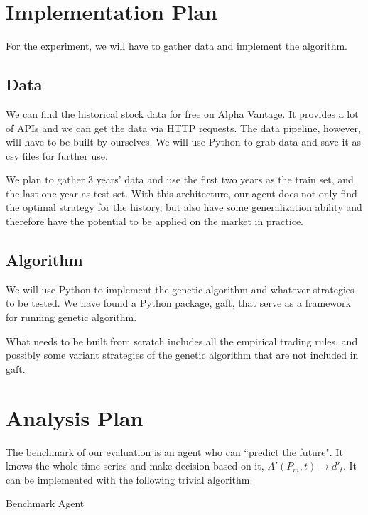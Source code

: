 \documentclass{article}
\begin{document}
\section{Implementation Plan}

For the experiment, we will have to gather data and implement the algorithm.

\subsection{Data}

We can find the historical stock data for free on \href{https://www.alphavantage.co/}{Alpha Vantage}.
It provides a lot of APIs and we can get the data via HTTP requests.
The data pipeline, however, will have to be built by ourselves.
We will use Python to grab data and save it as csv files for further use.

We plan to gather 3 years' data and use the first two years as the train set,
and the last one year as test set.
With this architecture, our agent does not only find the optimal strategy for the history,
but also have some generalization ability and therefore have the potential to be applied on the market in practice.

\subsection{Algorithm}

We will use Python to implement the genetic algorithm and whatever strategies to be tested.
We have found a Python package, \href{https://github.com/PytLab/gaft}{gaft}, that serve as a framework for running genetic algorithm.

What needs to be built from scratch includes all the empirical trading rules,
and possibly some variant strategies of the genetic algorithm that are not included in gaft.

\section{Analysis Plan}

The benchmark of our evaluation is an agent who can ``predict the future".
It knows the whole time series and make decision based on it,
$A'(P_m, t) \rightarrow d'_t$.
It can be implemented with the following trivial algorithm.
\begin{algorithm}[H]

	\caption{Benchmark Agent}
\end{algorithm}
\end{document}
